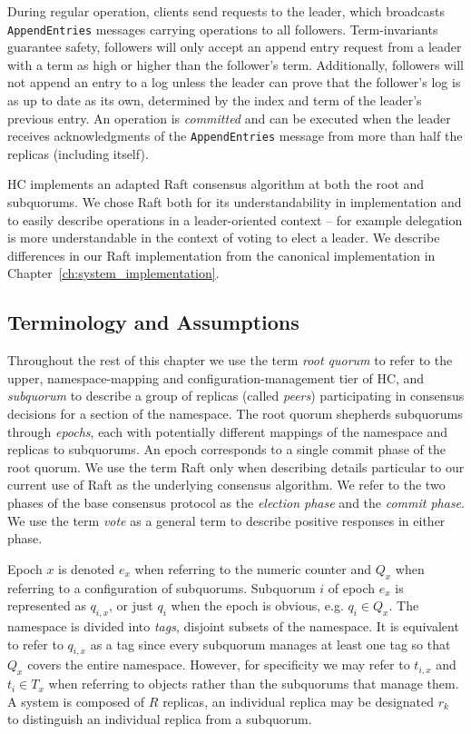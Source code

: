 During regular operation, clients send requests to the leader, which broadcasts \texttt{AppendEntries} messages carrying operations to all followers.
Term-invariants guarantee safety, followers will only accept an append entry request from a leader with a term as high or higher than the follower's term.
Additionally, followers will not append an entry to a log unless the leader can prove that the follower's log is as up to date as its own, determined by the index and term of the leader's previous entry.
An operation is \emph{committed} and can be executed when the leader receives acknowledgments of the \texttt{AppendEntries} message from more than half the replicas (including itself).

HC implements an adapted Raft consensus algorithm at both the root and subquorums.
We chose Raft both for its understandability in implementation and to easily describe operations in a leader-oriented context -- for example delegation is more understandable in the context of voting to elect a leader.
We describe differences in our Raft implementation from the canonical implementation in Chapter~\ref{ch:system_implementation}.

\subsection{Terminology and Assumptions}
\label{ch03_terminology}

Throughout the rest of this chapter we use the term \emph{root quorum} to refer to the upper, namespace-mapping and configuration-management tier of HC, and \emph{subquorum} to describe a group of replicas (called \emph{peers}) participating in consensus decisions for a section of the namespace.
The root quorum shepherds subquorums through \emph{epochs}, each with potentially different mappings of the namespace and replicas to subquorums.
An epoch corresponds to a single commit phase of the root quorum.
We use the term Raft only when describing details particular to our current use of Raft as the underlying consensus algorithm.
We refer to the two phases of the base consensus protocol as the \emph{election phase} and the \emph{commit phase}.
We use the term \emph{vote} as a general term to describe positive responses in either phase.

Epoch $x$ is denoted $e_x$ when referring to the numeric counter and $Q_x$ when referring to a configuration of subquorums.
Subquorum $i$ of epoch $e_x$ is represented as $q_{i,x}$, or just $q_i$ when the epoch is obvious, e.g. $q_i \in Q_x$.
The namespace is divided into \emph{tags}, disjoint subsets of the namespace.
It is equivalent to refer to $q_{i,x}$ as a tag since every subquorum manages at least one tag so that $Q_x$ covers the entire namespace.
However, for specificity we may refer to $t_{i,x}$ and $t_i \in T_x$ when referring to objects rather than the subquorums that manage them.
A system is composed of $R$ replicas, an individual replica may be designated $r_k$ to distinguish an individual replica from a subquorum.

